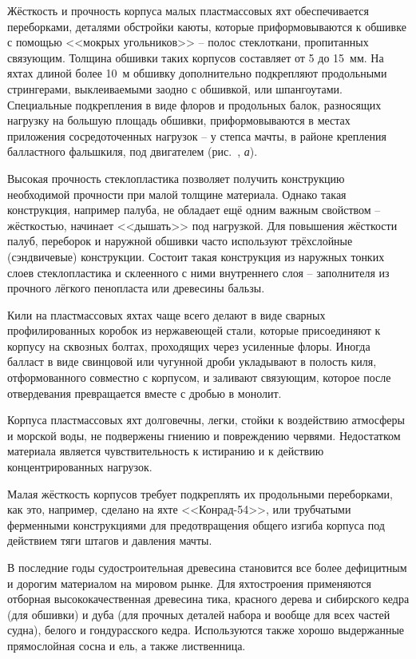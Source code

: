 Жёсткость и прочность корпуса малых пластмассовых яхт обеспечивается
переборками, деталями обстройки каюты, которые приформовываются к
обшивке с помощью <<мокрых угольников>> \--- полос стеклоткани,
пропитанных связующим. Толщина обшивки таких корпусов составляет от 5
до 15~мм. На яхтах длиной более 10~м обшивку дополнительно подкрепляют
продольными стрингерами, выклеиваемыми заодно с обшивкой, или
шпангоутами. Специальные подкрепления в виде флоров и продольных
балок, разносящих нагрузку на большую площадь обшивки,
приформовываются в местах приложения сосредоточенных нагрузок \--- у
степса мачты, в районе крепления балластного фальшкиля, под двигателем
(рис.~, \textit{а}).

Высокая прочность стеклопластика позволяет получить конструкцию
необходимой прочности при малой толщине материала. Однако такая
конструкция, например палуба, не обладает ещё одним важным свойством
\--- жёсткостью, начинает <<дышать>> под нагрузкой. Для повышения
жёсткости палуб, переборок и наружной обшивки часто используют
трёхслойные (сэндвичевые) конструкции. Состоит такая конструкция из
наружных тонких слоев стеклопластика и склеенного с ними внутреннего
слоя \--- заполнителя из прочного лёгкого пенопласта или древесины
бальзы.

Кили на пластмассовых яхтах чаще всего делают в виде сварных
профилированных коробок из нержавеющей стали, которые присоединяют к
корпусу на сквозных болтах, проходящих через усиленные флоры. Иногда
балласт в виде свинцовой или чугунной дроби укладывают в полость киля,
отформованного совместно с корпусом, и заливают связующим, которое
после отвердевания превращается вместе с дробью в монолит.

Корпуса пластмассовых яхт долговечны, легки, стойки к воздействию
атмосферы и морской воды, не подвержены гниению и повреждению
червями. Недостатком материала является чувствительность к истиранию и
к действию концентрированных нагрузок.

Малая жёсткость корпусов требует подкреплять их продольными
переборками, как это, например, сделано на яхте <<Конрад-54>>, или
трубчатыми ферменными конструкциями для предотвращения общего изгиба
корпуса под действием тяги штагов и давления мачты.

В последние годы судостроительная древесина становится все более
дефицитным и дорогим материалом на мировом рынке. Для яхтостроения
применяются отборная высококачественная древесина тика, красного
дерева и сибирского кедра (для обшивки) и дуба (для прочных деталей
набора и вообще для всех частей судна), белого и гондурасского
кедра. Используются также хорошо выдержанные прямослойная сосна и ель,
а также лиственница.

